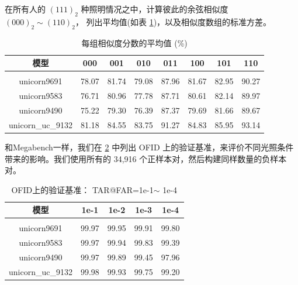 \documentclass[a4paper, 11pt, UTF8]{ctexart}%
\begin{document}
在所有人的 $(111)_2$ 种照明情况之中，计算彼此的余弦相似度 $(000)_2\sim(110)_2$， 列出平均值(如表 \ref{table:lighting_ave})，以及相似度数组的标准方差。

\begin{table}[h]
\caption{每组相似度分数的平均值 (\%)}
\label{table:lighting_ave}
\begin{center}
\begin{tabular}{cccccccc}
\multicolumn{1}{c}{\bf 模型}   &\multicolumn{1}{c}{\bf 000} &\multicolumn{1}{c}{\bf 001} &\multicolumn{1}{c}{\bf 010} &\multicolumn{1}{c}{\bf 011} &\multicolumn{1}{c}{\bf 100} &\multicolumn{1}{c}{\bf 101} &\multicolumn{1}{c}{\bf 110}\\
\hline \\
unicorn9691 &  78.07 & 81.74 & 79.08 & 87.96 & 81.67 & 82.95 & 90.27  \\
\rowcolor{t_gary}
unicorn9583 &  76.71 & 80.96 & 77.78 & 87.71 & 80.61 & 82.14 & 89.97  \\
unicorn9490 &  75.22 & 79.30 & 76.39 & 87.37 & 79.69 & 81.66 & 89.67  \\
\rowcolor{t_gary}
unicorn\_uc\_9132 &  81.18 & 84.55 & 83.75 & 91.27 & 84.83 & 85.95 & 93.14  \\
\end{tabular}
\end{center}
\end{table}

和Megabench一样，我们在 \ref{table:OFID} 中列出 OFID 上的验证基准，来评价不同光照条件带来的影响。我们使用所有的 34,916 个正样本对，然后构建同样数量的负样本对。


\begin{table}[!htbp]
\caption{OFID上的验证基准： TAR@FAR=1e-1$\sim$ 1e-4}
\label{table:OFID}
\begin{center}
\begin{tabular}{ccccc}
\multicolumn{1}{c}{\bf 模型}  &\multicolumn{1}{c}{\bf 1e-1} &\multicolumn{1}{c}{\bf 1e-2} &\multicolumn{1}{c}{\bf 1e-3} &\multicolumn{1}{c}{\bf 1e-4}
\\ \hline \\
unicorn9691 &  99.97 & 99.95 & 99.91 & 99.80 \\
unicorn9583 &  99.97 & 99.94 & 99.83 & 99.39 \\
unicorn9490 &  99.97 & 99.89 & 99.45 & 97.96 \\
unicorn\_uc\_9132 &  99.98 & 99.93 & 99.75 & 99.20  \\
\end{tabular}
\end{center}
\end{table}
\end{document}
